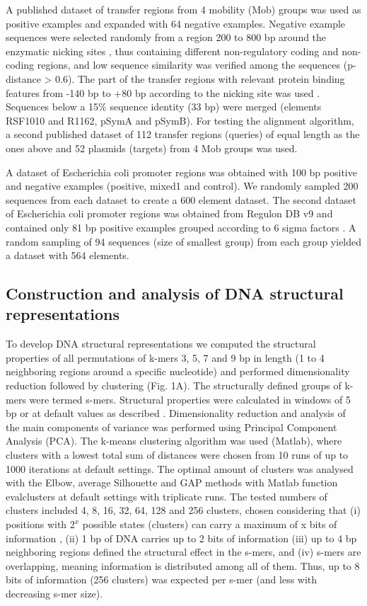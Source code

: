\documentclass[sigconf]{acmart}
\begin{document}
A published dataset of transfer regions from 4 mobility (Mob) groups \cite{Zrimec2018-lx} was used as positive examples and expanded with 64 negative examples. Negative example sequences were selected randomly from a region 200 to 800 bp around the enzymatic nicking sites \cite{Zrimec2018-lx}, thus containing different non-regulatory coding and non-coding regions, and low sequence similarity was verified among the sequences (p-distance > 0.6). The part of the transfer regions with relevant protein binding features from -140 bp to +80 bp according to the nicking site was used \cite{Zrimec2018-lx}. Sequences below a 15\% sequence identity (33 bp) were merged (elements RSF1010 and R1162, pSymA and pSymB). For testing the alignment algorithm, a second published dataset of 112 transfer regions (queries) of equal length as the ones above and 52 plasmids (targets) \cite{Zrimec2020-wx} from 4 Mob groups was used.

A dataset of Escherichia coli promoter regions was obtained \cite{Gusmao2014-hp} with 100 bp positive and negative examples (positive, mixed1 and control). We randomly sampled 200 sequences from each dataset to create a 600 element dataset. The second dataset of Escherichia coli promoter regions was obtained from Regulon DB v9 \cite{Gama-Castro2016-so} and contained only 81 bp positive examples grouped according to 6 sigma factors \cite{Watson2008-dt}. A random sampling of 94 sequences (size of smallest group) from each group yielded a dataset with 564 elements.

\subsection{Construction and analysis of DNA structural representations}
To develop DNA structural representations we computed the structural properties of all permutations of k-mers 3, 5, 7 and 9 bp in length (1 to 4 neighboring regions around a specific nucleotide) and performed dimensionality reduction followed by clustering (Fig. 1A). The structurally defined groups of k-mers were termed s-mers. Structural properties were calculated in windows of 5 bp or at default values as described \cite{Zrimec2015-xf,Zrimec2018-lx}. Dimensionality reduction and analysis of the main components of variance was performed using Principal Component Analysis (PCA). The k-means clustering algorithm was used (Matlab), where clusters with a lowest total sum of distances were chosen from 10 runs of up to 1000 iterations at default settings. The optimal amount of clusters was analysed with the Elbow, average Silhouette \cite{Rousseeuw1987-mx} and GAP \cite{Tibshirani2001-wq} methods with Matlab function evalclusters at default settings with triplicate runs. The tested numbers of clusters included 4, 8, 16, 32, 64, 128 and 256 clusters, chosen considering that (i) positions with $2^x$ possible states (clusters) can carry a maximum of x bits of information \cite{Schneider1986-iv}, (ii) 1 bp of DNA carries up to 2 bits of information (iii) up to 4 bp neighboring regions defined the structural effect in the s-mers, and (iv) s-mers are overlapping, meaning information is distributed among all of them. Thus, up to 8 bits of information (256 clusters) was expected per s-mer (and less with decreasing s-mer size). 
\end{document}
